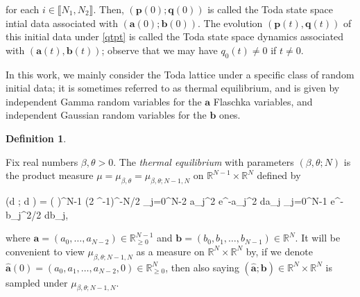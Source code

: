 \documentclass{amsart}
\numberwithin{equation}{section}
\theoremstyle{remark}
\theoremstyle{definition}
\newtheorem{definition}[thm]{Definition}
\begin{document}
	\noindent  for each $i \in \llbracket N_1, N_2 \rrbracket$. Then, $( \bm{p} (0); \bm{q} (0) )$ is called the Toda state space intial data associated with $(\bm{a} (0); \bm{b}(0) )$. The evolution $( \bm{p}(t), \bm{q}(t) )$ of this initial data under \eqref{qtpt} is called the Toda state space dynamics associated with $( \bm{a}(t), \bm{b}(t) )$; observe that we may have $q_0 (t) \ne 0$ if $t \ne 0$.	
	
	In this work, we mainly consider the Toda lattice under a specific class of random initial data; it is sometimes referred to as thermal equilibrium, and is given by independent Gamma random variables for the $\bm{a}$ Flaschka variables, and independent Gaussian random variables for the $\bm{b}$ ones.
	
	\begin{definition}
		\label{mubeta2} 
		
		Fix real numbers $\beta, \theta > 0$. The \emph{thermal equilibrium} with parameters $(\beta, \theta; N)$ is the product measure $\mu = \mu_{\beta, \theta} = \mu_{\beta, \theta; N-1,N}$ on $\mathbb{R}^{N-1} \times \mathbb{R}^N$ defined by 
		\begin{flalign*}
			\mu (d ; d ) = \bigg( \displaystyle\frac{2 \beta^{\theta}}{\Gamma(\theta)} \bigg)^{N-1}  (2 \pi \beta^{-1})^{-N/2} \cdot \displaystyle\prod_{j=0}^{N-2} a_j^{2} e^{-\beta a_j^2} da_j  \displaystyle\prod_{j=0}^{N-1} e^{-\beta b_j^2/2} db_j,
		\end{flalign*}
		
		\noindent where $\bm{a} = (a_0, \ldots , a_{N-2}) \in \mathbb{R}_{\ge 0}^{N-1}$ and $\bm{b} = (b_0, b_1, \ldots , b_{N-1}) \in \mathbb{R}^N$. It will be convenient to view $\mu_{\beta,\theta;N-1,N}$ as a measure on $\mathbb{R}^N \times \mathbb{R}^N$ by, if we denote $\hat{\bm{a}}(0) = (a_0, a_1, \ldots , a_{N-2}, 0) \in \mathbb{R}_{\ge 0}^N$, then also saying $(\hat{\bm{a}}; \bm{b}) \in \mathbb{R}^N \times \mathbb{R}^N$ is sampled under $\mu_{\beta,\theta;N-1,N}$. 
		
	\end{definition} 
\end{document}
